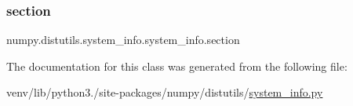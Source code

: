 \mbox{\label{classnumpy_1_1distutils_1_1system__info_1_1system__info_a01714a558544933167597bf98cf1071a}} 
\subsubsection{\texorpdfstring{section}{section}}
{\footnotesize\ttfamily numpy.\+distutils.\+system\+\_\+info.\+system\+\_\+info.\+section\hspace{0.3cm}{\ttfamily [static]}}



The documentation for this class was generated from the following file\+:\begin{DoxyCompactItemize}
\item 
venv/lib/python3./site-\/packages/numpy/distutils/\hyperlink{system__info_8py}{system\+\_\+info.\+py}\end{DoxyCompactItemize}
